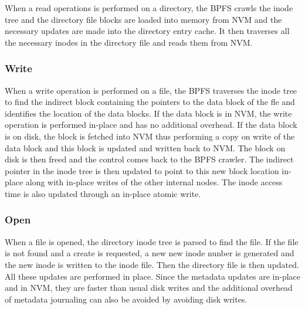 When a read operations is performed on a directory, the BPFS crawls the inode tree and the directory file blocks are loaded into memory from NVM and the necessary updates are made into the directory entry cache. It then traverses all the necessary inodes in the directory file and reads them from NVM.
 
\subsubsection{Write}
When a write operation is performed on a file, the BPFS traverses the inode tree to find the indirect block containing the pointers to the data block of the fle and identifies the location of the data blocks. If the data block is in NVM, the write operation is performed in-place and has no additional overhead. If the data block is on disk, the block is fetched into NVM thus performing a copy on write of the data block and this block is updated and written back to NVM. The block on disk is then freed and the control comes back to the BPFS crawler. The indirect pointer in the inode tree is then updated to point to this new block location in-place along with in-place writes of the other internal nodes. The inode access time is also updated through an in-place atomic write.

\subsubsection{Open}
When a file is opened, the directory inode tree is parsed to find the file. If the file is not found and a create is requested, a new new inode nunber is generated and the new inode is written to the inode file. Then the directory file is then updated. All these updates are performed in place. Since the metadata updates are in-place and in NVM, they are faster than usual disk writes and the additional overhead of metadata journaling can also be avoided by avoiding disk writes.

